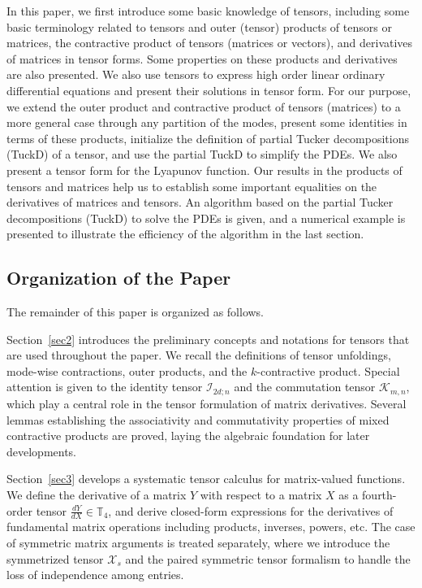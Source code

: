 \documentclass[11pt, oneside]{article}  %
\newcommand{\TT}{\mathbb{T}}
\newcommand{\caI}{\mathcal{I}}
\newcommand{\caK}{\mathcal{K}}
\newcommand{\X}{\mathcal{X}}
\begin{document}
In this paper, we first introduce some basic knowledge of tensors, including some basic terminology related to tensors and outer 
(tensor) products of tensors or matrices, the contractive product of tensors (matrices or vectors), and derivatives of matrices in tensor forms. 
Some properties on these products and derivatives are also presented. We also use tensors to express high order linear ordinary differential 
equations and present their solutions in tensor form.  For our purpose, we extend the outer product and contractive product of tensors (matrices) 
to a more general case through any partition of the modes, present some identities in terms of these products, initialize the definition of partial 
Tucker decompositions (TuckD) of a tensor, and use the partial TuckD to simplify the PDEs.  We also present a tensor form for the Lyapunov 
function. Our results in the products of tensors and matrices help us to establish some important equalities on the derivatives of matrices and 
tensors.  An algorithm based on the partial Tucker decompositions (TuckD) to solve the PDEs is given, and a numerical example is presented 
to illustrate the efficiency of the algorithm in the last section. \\  

\subsection{Organization of the Paper}
\label{sec1-2:organization}

The remainder of this paper is organized as follows.  

Section~\ref{sec2} introduces the preliminary concepts and notations for tensors that are used throughout the paper.  We recall the definitions of tensor unfoldings, mode-wise contractions, outer products, and the $k$-contractive product.  Special attention is given to the identity tensor 
$\caI_{2d;n}$ and the commutation tensor $\caK_{m,n}$, which play a central role in the tensor formulation of matrix derivatives.  Several lemmas establishing the associativity and commutativity properties of mixed contractive products are proved, laying the algebraic foundation for later developments.

Section~\ref{sec3} develops a systematic tensor calculus for matrix-valued functions.  We define the derivative of a matrix $Y$ with respect to a 
matrix $X$ as a fourth-order tensor $\frac{dY}{dX}\in\TT_{4}$, and derive closed-form expressions for the derivatives of fundamental matrix 
operations including products, inverses, powers, etc.  The case of symmetric matrix arguments is treated separately, where we introduce the 
symmetrized tensor $\X_s$ and the paired symmetric tensor formalism to handle the loss of independence among entries.
\end{document}
